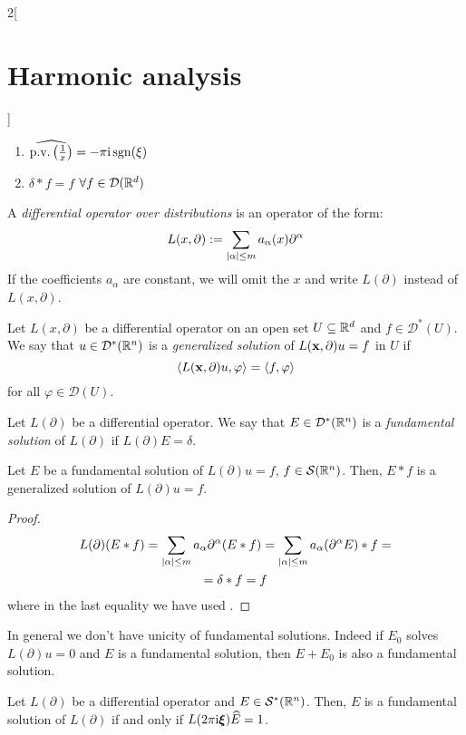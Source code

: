 \documentclass[../../../main_math.tex]{subfiles}
\begin{document}
\begin{multicols}{2}[\section{Harmonic analysis}]
\begin{lemma}
\begin{enumerate}
      \item $\widehat{\mathrm{p.v.}\left(\frac{1}{x}\right)}=-\pi \mathrm{i} \operatorname{sgn}(\xi)$
      \item $\delta*f=f$ $\forall f\in \mathcal{D}(\mathbb{R}^d)$
    \end{enumerate}
  \end{lemma}
  \begin{definition}
    A \emph{differential operator over distributions} is an operator of the form:
    $$
      L(x,\partial):=\sum_{\abs{\alpha}\leq m}a_\alpha(x)\partial^\alpha
    $$
    If the coefficients $a_\alpha$ are constant, we will omit the $x$ and write $L(\partial)$ instead of $L(x,\partial)$.
  \end{definition}
  \begin{definition}
    Let $L(x,\partial)$ be a differential operator on an open set $U\subseteq\mathbb{R}^d$ and $f\in \mathcal{D}^*(U)$. We say that $u\in\mathcal{D}^*(\mathbb{R}^n)$ is a \emph{generalized solution} of $L(\boldsymbol{\mathrm{x}},\partial)u=f$ in $U$ if
    $$
      \langle L(\boldsymbol{\mathrm{x}},\partial)u,\varphi\rangle=\langle f,\varphi\rangle
    $$
    for all $\varphi\in \mathcal{D}(U)$.
  \end{definition}
  \begin{definition}
    Let $L(\partial)$ be a differential operator. We say that $E\in\mathcal{D}^*(\mathbb{R}^n)$ is a \emph{fundamental solution} of $L(\partial)$ if $L(\partial)E=\delta$.
  \end{definition}
  \begin{theorem}
    Let $E$ be a fundamental solution of $L(\partial)u=f$, $f\in\mathcal{S}(\mathbb{R}^n)$. Then, $E*f$ is a generalized solution of $L(\partial)u=f$.
  \end{theorem}
  \begin{proof}
    \begin{multline*}
      L(\partial)(E*f)=\sum_{\abs{\alpha}\leq m}a_\alpha\partial^\alpha(E*f)=\sum_{\abs{\alpha}\leq m}a_\alpha(\partial^\alpha E)*f=\\=\delta*f=f
    \end{multline*}
    where in the last equality we have used .
  \end{proof}
  \begin{remark}
    In general we don't have unicity of fundamental solutions. Indeed if $E_0$ solves $L(\partial)u=0$ and $E$ is a fundamental solution, then $E+E_0$ is also a fundamental solution.
  \end{remark}
  \begin{theorem}
    Let $L(\partial)$ be a differential operator and $E\in\mathcal{S}^*(\mathbb{R}^n)$. Then, $E$ is a fundamental solution of $L(\partial)$ if and only if $L(2\pi\mathrm{i}\boldsymbol{\mathrm{\xi}})\widehat{E}=1$.

\end{theorem}
\end{multicols}
\end{document}
